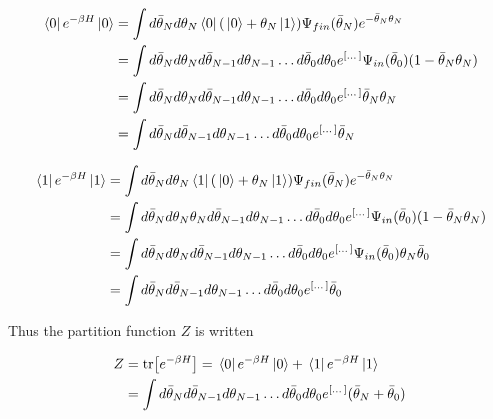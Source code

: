 \documentclass[12pt]{article}
\begin{document}
\begin{equation*}
    \begin{split}
        \bra*{0}e^{-\beta H}\ket*{0}&=\int d\bar{\theta}_Nd\theta_N\bra*{0}
        (\ket*{0}+\theta_N\ket*{1})\Psi_{fin}(\bar{\theta}_N)e^{-\bar{
            \theta}_N\theta_N}\\
        &=\int d\bar{\theta}_Nd\theta_Nd\bar{\theta}_{N-1}d\theta_{N-1}
        \dots d\bar{\theta}_0d\theta_0e^{[\dots]}\Psi_{in}(\bar{\theta}_0)
        (1-\bar{\theta}_N\theta_N)\\
        &=\int d\bar{\theta}_Nd\theta_Nd\bar{\theta}_{N-1}d\theta_{N-1}
        \dots d\bar{\theta}_0d\theta_0e^{[\dots]}\bar{\theta}_N\theta_N\\
        &=\int d\bar{\theta}_Nd\bar{\theta}_{N-1}d\theta_{N-1}
        \dots d\bar{\theta}_0d\theta_0e^{[\dots]}\bar{\theta}_N
    \end{split}
\end{equation*}

\begin{equation*}
    \begin{split}
        \bra*{1}e^{-\beta H}\ket*{1}&=\int d\bar{\theta}_Nd\theta_N\bra*{1}
        (\ket*{0}+\theta_N\ket*{1})\Psi_{fin}(\bar{\theta}_N)e^{-\bar{
            \theta}_N\theta_N}\\
        &=\int d\bar{\theta}_Nd\theta_N\theta_Nd\bar{\theta}_{N-1}
        d\theta_{N-1}\dots d\bar{\theta}_0d\theta_0e^{[\dots]}\Psi_{in}
        (\bar{\theta}_0)(1-\bar{\theta}_N\theta_N)\\
        &=\int d\bar{\theta}_Nd\theta_Nd\bar{\theta}_{N-1}
        d\theta_{N-1}\dots d\bar{\theta}_0d\theta_0e^{[\dots]}\Psi_{in}
        (\bar{\theta}_0)\theta_N\bar{\theta}_0\\
        &=\int d\bar{\theta}_Nd\bar{\theta}_{N-1}d\theta_{N-1}
        \dots d\bar{\theta}_0d\theta_0e^{[\dots]}\bar{\theta}_0
    \end{split}
\end{equation*}

Thus the partition function $Z$ is written

\begin{equation*}
    \begin{split}
        Z&=\tr[e^{-\beta H}]=\bra*{0}e^{-\beta H}\ket*{0}+
        \bra*{1}e^{-\beta H}\ket*{1}\\
        &=\int d\bar{\theta}_Nd\bar{\theta}_{N-1}d\theta_{N-1}
        \dots d\bar{\theta}_0d\theta_0e^{[\dots]}
        (\bar{\theta}_N+\bar{\theta}_0)
    \end{split}
\end{equation*}
\end{document}

